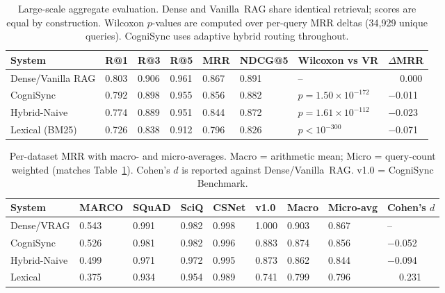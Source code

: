 \documentclass[sigconf,authordraft]{acmart}
\begin{document}
\begin{table}[t]
\caption{%
  Large-scale aggregate evaluation. Dense and Vanilla~RAG share identical
  retrieval; scores are equal by construction. Wilcoxon $p$-values are
  computed over per-query MRR deltas (34,929 unique queries). CogniSync uses
  adaptive hybrid routing throughout.%
}
\label{tab:large}
\footnotesize\setlength{\tabcolsep}{3pt}
\begin{tabularx}{\textwidth}{@{}LYYYYYLY@{}}
\toprule
\textbf{System} &
  \textbf{R@1} & \textbf{R@3} & \textbf{R@5} &
  \textbf{MRR} & \textbf{NDCG@5} & \textbf{Wilcoxon vs VR} &
  \textbf{$\Delta$MRR} \\
\midrule
Dense/Vanilla RAG & 0.803 & 0.906 & 0.961 & 0.867 & 0.891 & -- & $\phantom{-}$0.000 \\
CogniSync         & 0.792 & 0.898 & 0.955 & 0.856 & 0.882 & $p = 1.50\times 10^{-172}$ & $-$0.011 \\
Hybrid-Naive      & 0.774 & 0.889 & 0.951 & 0.844 & 0.872 & $p = 1.61\times 10^{-112}$ & $-$0.023 \\
Lexical (BM25)    & 0.726 & 0.838 & 0.912 & 0.796 & 0.826 & $p < 10^{-300}$ & $-$0.071 \\
\bottomrule
\end{tabularx}
\end{table}

\begin{table}[t]
\caption{%
  Per-dataset MRR with macro- and micro-averages. Macro = arithmetic mean;
  Micro = query-count weighted (matches Table~\ref{tab:large}). Cohen's
  $d$ is reported against Dense/Vanilla~RAG. v1.0 = CogniSync Benchmark.%
}
\label{tab:pds}
\footnotesize\setlength{\tabcolsep}{2.5pt}
\begin{tabularx}{\textwidth}{@{}LYYYYYYYY@{}}
\toprule
\textbf{System} &
  \textbf{MARCO} & \textbf{SQuAD} & \textbf{SciQ} &
  \textbf{CSNet} & \textbf{v1.0} & \textbf{Macro} &
  \textbf{Micro-avg} & \textbf{Cohen's $d$} \\
\midrule
Dense/VRAG   & 0.543 & 0.991 & 0.982 & 0.998 & 1.000 & 0.903 & 0.867 & -- \\
CogniSync    & 0.526 & 0.981 & 0.982 & 0.996 & 0.883 & 0.874 & 0.856 & $-$0.052 \\
Hybrid-Naive & 0.499 & 0.971 & 0.972 & 0.995 & 0.873 & 0.862 & 0.844 & $-$0.094 \\
Lexical      & 0.375 & 0.934 & 0.954 & 0.989 & 0.741 & 0.799 & 0.796 & $\phantom{-}$0.231 \\
\bottomrule
\end{tabularx}
\end{table}
\end{document}
